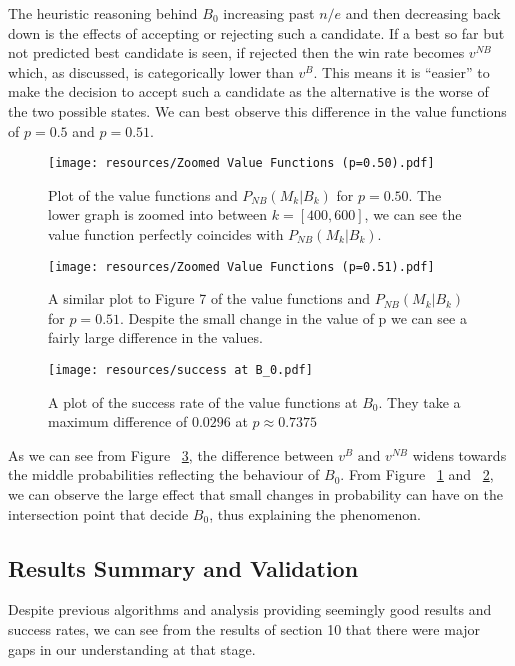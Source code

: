 \documentclass[a4paper,11pt]{article}
\begin{document}
The heuristic reasoning behind $B_0$ increasing past $n/e$ and then decreasing back down is the effects of accepting or rejecting such a candidate. If a best so far but not predicted best candidate is seen, if rejected then the win rate becomes $v^{NB}$ which, as discussed, is categorically lower than $v^B$. This means it is ``easier'' to make the decision  to accept such a candidate as the alternative is the worse of the two possible states. We can best observe this difference in the value functions of $p=0.5$ and $p=0.51$.

\begin{figure}[H]
    \centering
    \texttt{[image: resources/Zoomed Value Functions (p=0.50).pdf]}
    \caption{Plot of the value functions and $P_{NB}(M_k | B_k)$ for $p=0.50$. The lower graph is zoomed into between $k = [400,600]$, we can see the value function perfectly coincides with $P_{NB}(M_k|B_k)$. }    \label{fig:vector_plotp=0.50}
\end{figure}

\begin{figure}[H]
    \centering
    \texttt{[image: resources/Zoomed Value Functions (p=0.51).pdf]}
    \caption{A similar plot to Figure 7 of the value functions and $P_{NB}(M_k | B_k)$ for $p=0.51$. Despite the small change in the value of p we can see a fairly large difference in the values.}
    \label{fig:vector_plotp=0.51}
\end{figure}

\begin{figure}[H]
    \centering
    \texttt{[image: resources/success at B\_0.pdf]}
    \caption{A plot of the success rate of the value functions at $B_0$. They take a maximum difference of $0.0296$ at $p \approx 0.7375$}
    \label{fig:success at B_0}
\end{figure}

As we can see from Figure ~\ref{fig:success at B_0}, the difference between $v^B \text{ and } v^{NB}$ widens towards the middle probabilities reflecting the behaviour of $B_0$. From Figure ~\ref{fig:vector_plotp=0.50} and ~\ref{fig:vector_plotp=0.51}, we can observe the large effect that small changes in probability can have on the intersection point that decide $B_0$, thus explaining the phenomenon.

\subsection{Results Summary and Validation}
Despite previous algorithms and analysis providing seemingly good results and success rates, we can see from the results of section 10 that there were major gaps in our understanding at that stage. 
\end{document}
